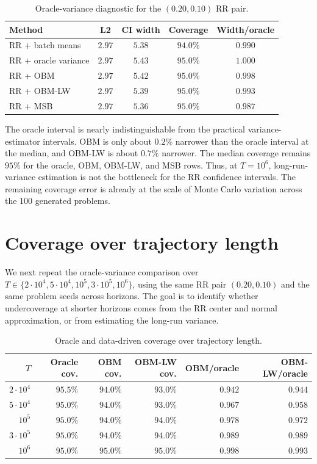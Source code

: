 \begin{table}[htbp]
\caption{Oracle-variance diagnostic for the $(0.20,0.10)$ RR pair.}
\centering
\begin{tabular}{lcccc}
\toprule
\textbf{Method} & \textbf{L2} & \textbf{CI width} & \textbf{Coverage}
& \textbf{Width/oracle} \\
\midrule
RR + batch means & $2.97$ & $5.38$ & $94.0\%$ & $0.990$ \\
RR + oracle variance & $2.97$ & $5.43$ & $95.0\%$ & $1.000$ \\
RR + OBM & $2.97$ & $5.42$ & $95.0\%$ & $0.998$ \\
RR + OBM-LW & $2.97$ & $5.39$ & $95.0\%$ & $0.993$ \\
RR + MSB & $2.97$ & $5.36$ & $95.0\%$ & $0.987$ \\
\bottomrule
\end{tabular}
\end{table}

The oracle interval is nearly indistinguishable from the practical
variance-estimator intervals. OBM is only about $0.2\%$ narrower than the
oracle interval at the median, and OBM-LW is about $0.7\%$ narrower. The
median coverage remains $95\%$ for the oracle, OBM, OBM-LW, and MSB rows.
Thus, at $T=10^6$, long-run-variance estimation is not the bottleneck for
the RR confidence intervals. The remaining coverage error is already at the
scale of Monte Carlo variation across the 100 generated problems.

\section{Coverage over trajectory length}

We next repeat the oracle-variance comparison over
$T\in\{2\cdot10^4,5\cdot10^4,10^5,3\cdot10^5,10^6\}$, using the same RR
pair $(0.20,0.10)$ and the same problem seeds across horizons. The goal is to
identify whether undercoverage at shorter horizons comes from the RR center
and normal approximation, or from estimating the long-run variance.

\begin{table}[htbp]
\caption{Oracle and data-driven coverage over trajectory length.}
\centering
\small
\begin{tabular}{rrrrrr}
\toprule
$T$ & \textbf{Oracle cov.} & \textbf{OBM cov.} & \textbf{OBM-LW cov.}
& \textbf{OBM/oracle} & \textbf{OBM-LW/oracle} \\
\midrule
$2\cdot10^4$ & $95.5\%$ & $94.0\%$ & $93.0\%$ & $0.942$ & $0.944$ \\
$5\cdot10^4$ & $95.0\%$ & $94.0\%$ & $93.0\%$ & $0.967$ & $0.958$ \\
$10^5$ & $95.0\%$ & $94.0\%$ & $94.0\%$ & $0.978$ & $0.972$ \\
$3\cdot10^5$ & $95.0\%$ & $94.0\%$ & $94.0\%$ & $0.989$ & $0.989$ \\
$10^6$ & $95.0\%$ & $95.0\%$ & $95.0\%$ & $0.998$ & $0.993$ \\
\bottomrule
\end{tabular}
\end{table}

